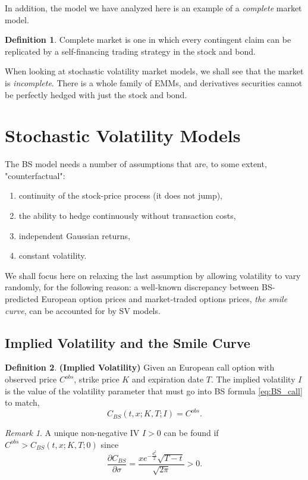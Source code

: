 \documentclass[a4paper,12pt]{article}
\numberwithin{equation}{section}
\theoremstyle{definition}
\newtheorem{definition}{Definition}[section]
\theoremstyle{remark}
\newtheorem{remark}{Remark}[section]
\begin{document}
In addition, the model we have analyzed here is an example of a 
\textit{complete} market model.
\begin{definition}
    Complete market is one in which every contingent claim can be 
    replicated by a self-financing trading strategy in the stock 
    and bond.
\end{definition}

When looking at stochastic volatility market models, we shall see 
that the market is \textit{incomplete}. There is a whole family of 
EMMs, and derivatives securities cannot be perfectly hedged with 
just the stock and bond.

\newpage
\section{Stochastic Volatility Models}
The BS model needs a number of assumptions that are, to some extent, 
"counterfactual":
\begin{enumerate}
    \item continuity of the stock-price process (it does not jump),
    \item the ability to hedge continuously without transaction costs,
    \item independent Gaussian returns,
    \item constant volatility.
\end{enumerate}
We shall focus here on relaxing the last assumption by allowing 
volatility to vary randomly, for the following reason: a well-known 
discrepancy between BS-predicted European option prices and market-traded 
options prices, \textit{the smile curve}, can be accounted for by 
SV models.

\subsection{Implied Volatility and the Smile Curve}
\begin{definition}
\textbf{(Implied Volatility)}
Given an European call option with observed price $C^{obs}$, strike 
price $K$ and expiration date $T$. The implied volatility $I$ is 
the value of the volatility parameter that must go into BS formula 
\eqref{eq:BS_call} to match, 
\begin{equation}
\label{eq:implied_volatility}
    C_{BS}(t,x;K,T;I)=C^{obs}.
\end{equation}
\end{definition}

\begin{remark}
A unique non-negative IV $I>0$ can be found if 
$C^{obs}>C_{BS}(t,x;K,T;0)$ since 
\begin{equation}
    \frac{\partial C_{BS}}{\partial \sigma}
    =\frac{xe^{-\frac{d_{1}^{2}}{2}}\sqrt{T-t}}{\sqrt{2\pi}}>0.
\end{equation}
\end{remark}
\end{document}
